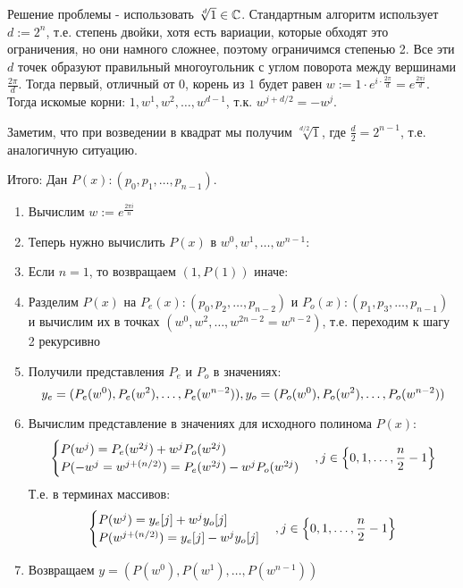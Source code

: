 \documentclass{article}
\begin{document}
  Решение проблемы - использовать $\sqrt[d]{1}\in\mathbb{C}$. Стандартным алгоритм использует $d:=2^n$, т.е. степень двойки, хотя есть вариации, которые обходят это ограничения, но они намного сложнее, поэтому ограничимся степенью 2. Все эти $d$ точек образуют правильный многоугольник с углом поворота между вершинами $\frac{2\pi}{d}$. Тогда первый, отличный от 0, корень из $1$ будет равен $w := 1 \cdot e^{i\cdot \frac{2\pi}{d}}=e^{\frac{2\pi i}{d}}$. Тогда искомые корни: $1,w^1,w^2,\dots,w^{d-1}$, т.к. $w^{j + d/2} = -w^{j}$.

  Заметим, что при возведении в квадрат мы получим $\sqrt[d/2]{1}$, где $\frac{d}{2} = 2^{n-1}$, т.е. аналогичную ситуацию.



  Итого: Дан $P(x):(p_0,p_1,\dots,p_{n-1})$.
  \begin{enumerate}
    \item Вычислим $w:=e^{\frac{2\pi i}{n}}$
    \item Теперь нужно вычислить $P(x)$ в $w^0,w^1,\dots,w^{n-1}$: 
    \item Если $n=1$, то возвращаем $(1, P(1))$ иначе: 
    \item Разделим $P(x)$ на $P_e(x):(p_0,p_2,\dots,p_{n-2})$ и $P_o(x):(p_1,p_3,\dots,p_{n-1})$\\ и вычислим их в точках $(w^0,w^2,\dots,w^{2n-2}=w^{n-2})$, т.е. переходим к шагу 2 рекурсивно
    \item Получили представления $P_e$ и $P_o$ в значениях: 
    \[y_e = (P_e(w^0),P_e(w^2),\dots,P_e(w^{n-2})),\q y_o=(P_o(w^0),P_o(w^2),\dots,P_o(w^{n-2}))\]
    \item Вычислим представление в значениях для исходного полинома $P(x)$:
    \[
    \begin{cases}
      P(w^j) = P_e(w^{2j}) + w^jP_o(w^{2j})\\
      P(-w^j = w^{j+(n/2)}) = P_e(w^{2j}) - w^jP_o(w^{2j})\\
    \end{cases},\q j\in \left\{0,1,\dots,\frac{n}{2}-1\right\}\]
    Т.е. в терминах массивов:
    \[\begin{cases}
      P(w^j) = y_e[j] + w^jy_o[j]\\
      P(w^{j+(n/2)}) = y_e[j] - w^jy_o[j]\\
    \end{cases},\q j\in \left\{0,1,\dots,\frac{n}{2}-1\right\}\]
    \item Возвращаем $y = (P(w^0),P(w^1),\dots, P(w^{n-1}))$
  \end{enumerate}
\end{document}
